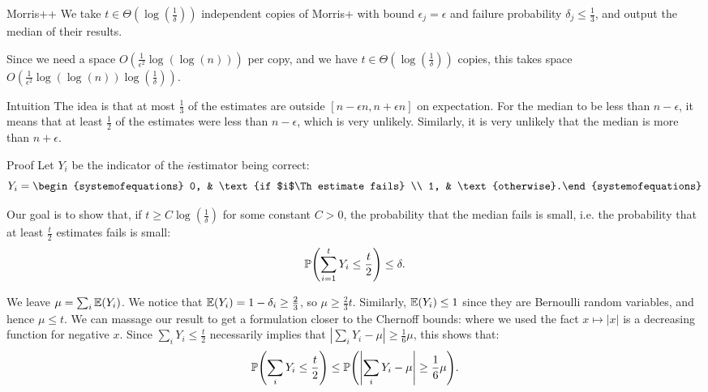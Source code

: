 \documentclass[a4paper]{article}
\begin{document}
\begin{parag}{Morris++}
    We take $t \in \Theta\left(\log\left(\frac{1}{\delta}\right)\right)$ independent copies of Morris+ with bound $\epsilon_j = \epsilon$ and failure probability $\delta_j \leq \frac{1}{3}$, and output the median of their results. 

    Since we need a space $O\left(\frac{1}{\epsilon^2} \log\left(\log\left(n\right)\right)\right)$ per copy, and we have $t\in \Theta\left(\log\left(\frac{1}{\delta}\right)\right)$ copies, this takes space $O\left(\frac{1}{\epsilon^2} \log\left(\log\left(n\right)\right) \log\left(\frac{1}{\delta}\right)\right)$.

    \begin{subparag}{Intuition}
        The idea is that at most $\frac{1}{3}$ of the estimates are outside $\left[n- \epsilon n, n + \epsilon n\right]$ on expectation. For the median to be less than $n - \epsilon$, it means that at least $\frac{1}{2}$ of the estimates were less than $n - \epsilon$, which is very unlikely. Similarly, it is very unlikely that the median is more than $n + \epsilon$.
    \end{subparag}

    \begin{subparag}{Proof}
        Let $Y_i$ be the indicator of the $i$\Th estimator being correct:
        \[Y_i = \begin{systemofequations} 0, & \text{if $i$\Th estimate fails} \\ 1, & \text{otherwise}.\end{systemofequations}\]

        Our goal is to show that, if $t \geq C \log\left(\frac{1}{\delta}\right)$ for some constant $C > 0$, the probability that the median fails is small, i.e. the probability that at least $\frac{t}{2}$ estimates fails is small: 
        \[\prob\left(\sum_{i=1}^{t} Y_i \leq \frac{t}{2}\right) \leq \delta.\]

        We leave $\mu = \sum_{i} \exval\left(Y_i\right)$. We notice that $\exval\left(Y_i\right) = 1 - \delta_i \geq \frac{2}{3}$, so $\mu \geq \frac{2}{3} t$. Similarly, $\exval\left(Y_i\right) \leq 1$ since they are Bernoulli random variables, and hence $\mu \leq t$. We can massage our result to get a formulation closer to the Chernoff bounds: 
        where we used the fact $x \mapsto \left|x\right|$ is a decreasing function for negative $x$. Since $\sum_{i} Y_i \leq \frac{t}{2}$ necessarily implies that $\left|\sum_{i} Y_i - \mu\right| \geq \frac{1}{6} \mu$, this shows that:
        \[\prob\left(\sum_{i} Y_i \leq \frac{t}{2}\right) \leq \prob\left(\left|\sum_{i} Y_i - \mu\right| \geq \frac{1}{6} \mu\right).\]


\end{subparag}
\end{parag}
\end{document}
